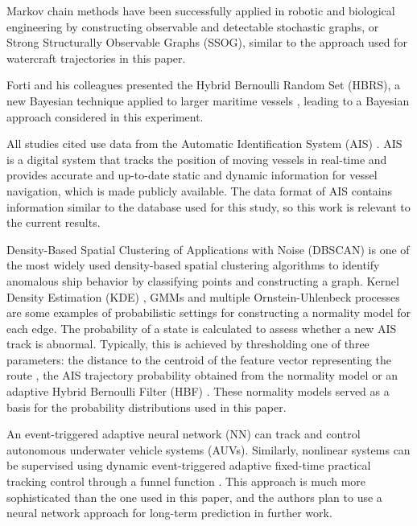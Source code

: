 \documentclass[preprint,12pt]{elsarticle}
\begin{document}
Markov chain methods have been successfully applied in robotic \cite{10130587} and biological engineering \cite{10106394, 10309224} by constructing observable and detectable stochastic graphs, or Strong Structurally Observable Graphs (SSOG), similar to the approach used for watercraft trajectories in this paper.

Forti and his colleagues presented the Hybrid Bernoulli Random Set (HBRS), a new Bayesian technique applied to larger maritime vessels \citep{2018Forti, 2019Forti, 2020FortiO, 2022Forti2, 2022FortiO, 2022Forti1}, leading to a Bayesian approach considered in this experiment.

All studies cited use data from the Automatic Identification System (AIS) \citep{2016Ning}. AIS is a digital system that tracks the position of moving vessels in real-time and provides accurate and up-to-date static and dynamic information for vessel navigation, which is made publicly available. The data format of AIS contains information similar to the database used for this study, so this work is relevant to the current results.

Density-Based Spatial Clustering of Applications with Noise (DBSCAN) \citep{Ester1996ADA} is one of the most widely used density-based spatial clustering algorithms to identify anomalous ship behavior \citep{2018Coscia, 2018dAfflisio1, 2016Millefiori, Khan2004RealtimePO, 2021Pedroche} by classifying points and constructing a graph. Kernel Density Estimation (KDE) \citep{2013Pallotta, 2020Loi}, GMMs \citep{2008Laxhammar} and multiple Ornstein-Uhlenbeck processes \citep{2019Forti, 2018Coscia1, 2014Pallotta} are some examples of probabilistic settings for constructing a normality model for each edge. The probability of a state is calculated to assess whether a new AIS track is abnormal. Typically, this is achieved by thresholding one of three parameters: the distance to the centroid of the feature vector representing the route \citep{Varlamis2019ANA}, the AIS trajectory probability obtained from the normality model \citep{2013Pallotta} or an adaptive Hybrid Bernoulli Filter (HBF) \citep{2019Forti}. These normality models served as a basis for the probability distributions used in this paper.

An event-triggered adaptive neural network (NN) \cite{10681283} can track and control autonomous underwater vehicle systems (AUVs). Similarly, nonlinear systems can be supervised using dynamic event-triggered adaptive fixed-time practical tracking control through a funnel function \cite{10681502}. This approach is much more sophisticated than the one used in this paper, and the authors plan to use a neural network approach for long-term prediction in further work.
\end{document}
